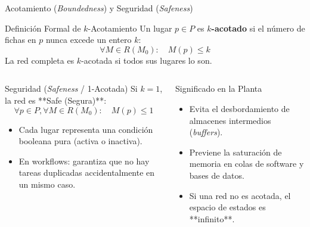 \documentclass[10pt, aspectratio=169]{beamer}
\begin{document}
\begin{frame}{Acotamiento (\emph{Boundedness}) y Seguridad (\emph{Safeness})}
	\begin{block}{Definición Formal de $k$-Acotamiento}
		Un lugar $p \in P$ es \textbf{$k$-acotado} si el número de fichas en $p$ nunca excede un entero $k$:
		\[ \forall M \in R(M_0): \quad M(p) \le k \]
		La red completa es $k$-acotada si todos sus lugares lo son.
	\end{block}

	\begin{columns}
		\begin{alertblock}{Seguridad (\emph{Safeness} / 1-Acotada)}
			Si $k=1$, la red es **Safe (Segura)**:
			\[ \forall p \in P, \forall M \in R(M_0): \quad M(p) \le 1 \]
			\begin{itemize}
				\item Cada lugar representa una condición booleana pura (activa o inactiva).
				\item En workflows: garantiza que no hay tareas duplicadas accidentalmente en un mismo caso.
			\end{itemize}
		\end{alertblock}

		\begin{exampleblock}{Significado en la Planta}
			\begin{itemize}
				\item Evita el desbordamiento de almacenes intermedios (\emph{buffers}).
				\item Previene la saturación de memoria en colas de software y bases de datos.
				\item Si una red no es acotada, el espacio de estados es **infinito**.
			\end{itemize}
		\end{exampleblock}
	\end{columns}
\end{frame}
\end{document}
